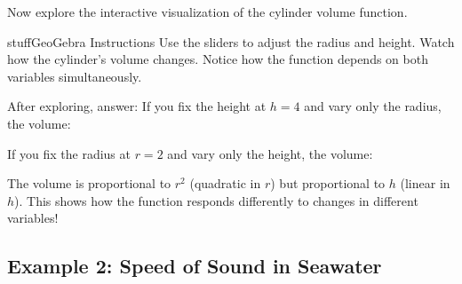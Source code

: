 \documentclass{ximera}
\begin{document}
\begin{problem}
Now explore the interactive visualization of the cylinder volume function.

\begin{expandable}{stuff}{GeoGebra Instructions}
    Use the sliders to adjust the radius and height. Watch how the cylinder's volume changes. Notice how the function depends on both variables simultaneously.
\end{expandable}

\begin{center}
\end{center}

After exploring, answer: If you fix the height at $h=4$ and vary only the radius, the volume:
\begin{multipleChoice}
\end{multipleChoice}

If you fix the radius at $r=2$ and vary only the height, the volume:
\begin{multipleChoice}
\end{multipleChoice}

\begin{feedback}
The volume is proportional to $r^2$ (quadratic in $r$) but proportional to $h$ (linear in $h$). This shows how the function responds differently to changes in different variables!
\end{feedback}
\end{problem}

\subsection*{Example 2: Speed of Sound in Seawater}
\end{document}
